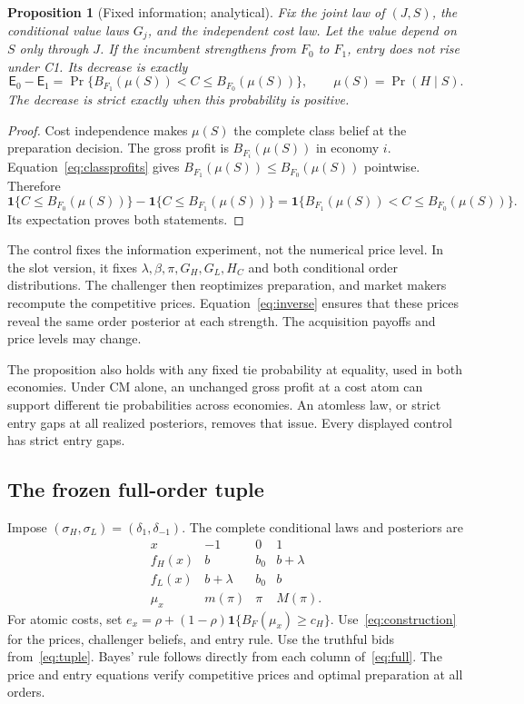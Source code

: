 \documentclass[12pt]{article}
\newtheorem{proposition}{Proposition}
\newcommand{\Ent}{\mathsf E}
\newcommand{\ind}{\mathbf 1}
\begin{document}
\begin{proposition}[Fixed information; analytical]\label{prop:control}
Fix the joint law of $(J,S)$, the conditional value laws $G_j$, and the independent cost law.
Let the value depend on $S$ only through $J$.
If the incumbent strengthens from $F_0$ to $F_1$, entry does not rise under C1.
Its decrease is exactly
\begin{equation}\label{eq:crossing}
 \Ent_0-\Ent_1
 =\Pr\{B_{F_1}(\mu(S))<C\le B_{F_0}(\mu(S))\},
 \qquad \mu(S)=\Pr(H\mid S).
\end{equation}
The decrease is strict exactly when this probability is positive.
\end{proposition}

\begin{proof}
Cost independence makes $\mu(S)$ the complete class belief at the preparation decision.
The gross profit is $B_{F_i}(\mu(S))$ in economy $i$.
Equation~\eqref{eq:classprofits} gives $B_{F_1}(\mu(S))\le B_{F_0}(\mu(S))$ pointwise.
Therefore
\[
 \ind\{C\le B_{F_0}(\mu(S))\}-\ind\{C\le B_{F_1}(\mu(S))\}
 =\ind\{B_{F_1}(\mu(S))<C\le B_{F_0}(\mu(S))\}.
\]
Its expectation proves both statements.
\end{proof}

The control fixes the information experiment, not the numerical price level.
In the slot version, it fixes $\lambda,\beta,\pi,G_H,G_L,H_C$ and both conditional order distributions.
The challenger then reoptimizes preparation, and market makers recompute the competitive prices.
Equation~\eqref{eq:inverse} ensures that these prices reveal the same order posterior at each strength.
The acquisition payoffs and price levels may change.

The proposition also holds with any fixed tie probability at equality, used in both economies.
Under CM alone, an unchanged gross profit at a cost atom can support different tie probabilities across economies.
An atomless law, or strict entry gaps at all realized posteriors, removes that issue.
Every displayed control has strict entry gaps.

\subsection{The frozen full-order tuple}

Impose $(\sigma_H,\sigma_L)=(\delta_1,\delta_{-1})$.
The complete conditional laws and posteriors are
\begin{equation}\label{eq:full}
\begin{array}{c|ccc}
 x&-1&0&1\\ \hline
 f_H(x)&b&b_0&b+\lambda\\
 f_L(x)&b+\lambda&b_0&b\\
 \mu_x&m(\pi)&\pi&M(\pi).
\end{array}
\end{equation}
For atomic costs, set $e_x=\rho+(1-\rho)\ind\{B_F(\mu_x)\ge c_H\}$.
Use~\eqref{eq:construction} for the prices, challenger beliefs, and entry rule.
Use the truthful bids from~\eqref{eq:tuple}.
Bayes' rule follows directly from each column of~\eqref{eq:full}.
The price and entry equations verify competitive prices and optimal preparation at all orders.
\end{document}
